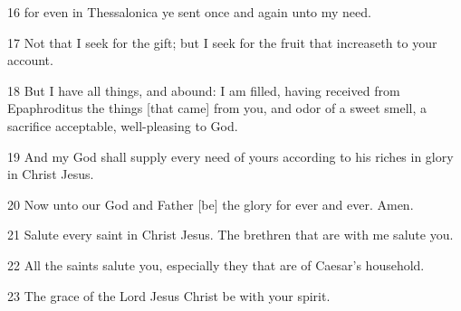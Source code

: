 \par 16 for even in Thessalonica ye sent once and again unto my need.
\par 17 Not that I seek for the gift; but I seek for the fruit that increaseth to your account.
\par 18 But I have all things, and abound: I am filled, having received from Epaphroditus the things [that came] from you, and odor of a sweet smell, a sacrifice acceptable, well-pleasing to God.
\par 19 And my God shall supply every need of yours according to his riches in glory in Christ Jesus.
\par 20 Now unto our God and Father [be] the glory for ever and ever. Amen.
\par 21 Salute every saint in Christ Jesus. The brethren that are with me salute you.
\par 22 All the saints salute you, especially they that are of Caesar's household.
\par 23 The grace of the Lord Jesus Christ be with your spirit.

